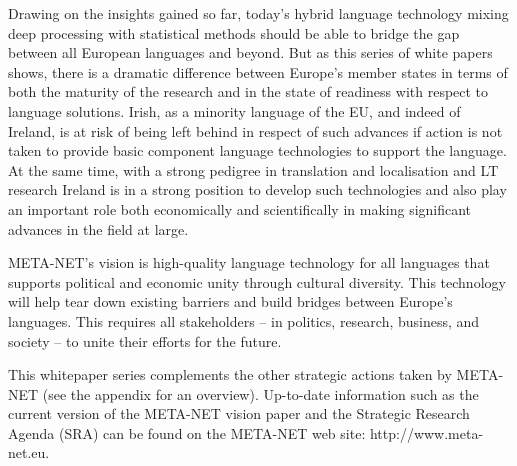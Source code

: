 \documentclass[]{../../metanetpaper}
\begin{document}
\begin{multicols}{2}

Drawing on the insights gained so far, today’s hybrid language technology mixing deep processing with statistical methods should be able to bridge the gap between all European languages and beyond. But as this series of white papers shows, there is a dramatic difference between Europe's member states in terms of both the maturity of the research and in the state of readiness with respect to language solutions. Irish, as a minority language of the EU, and indeed of Ireland, is at risk of being left behind in respect of such advances if action is not taken to provide basic component language technologies to support the language. At the same time, with a strong pedigree in translation and localisation and LT research Ireland is in a strong position to develop such technologies and also play an important role both economically and scientifically in making significant advances in the field at large.

META-NET's vision is high-quality language technology for all languages that supports political and economic unity through cultural diversity. This technology will help tear down existing barriers and build bridges between Europe's languages. This requires all stakeholders -- in politics, research, business, and society -- to unite their efforts for the future.

This whitepaper series complements the other strategic actions taken by META-NET (see the appendix for an overview). Up-to-date information such as the current version of the META-NET vision paper \cite{Meta1} and the Strategic Research Agenda (SRA) can be found on the META-NET web site: http://www.meta-net.eu.
\end{multicols}

\clearpage

\end{document}
